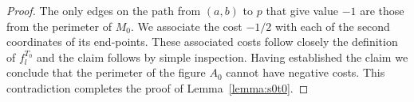\documentclass{theoretics}
\begin{document}
\begin{proof}
The only edges on the path from $(a,b)$ to $p$ that
give value $-1$ are those from the perimeter of $M_0$.  
We associate the cost $-1/2$ with each of the second
coordinates of its end-points.  These associated costs follow
closely the definition
of $f_l^{T_0}$ and the claim follows
by simple inspection.  Having established the claim we conclude
that the perimeter of the figure $A_0$ cannot have negative
costs.  This contradiction completes the proof of
Lemma~\ref{lemma:s0t0}.
\end{proof}
\end{document}
